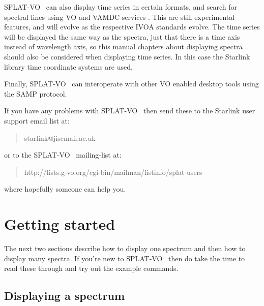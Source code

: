 \documentclass[twoside,11pt,nolof]{starlink}
\providecommand{\SPLAT}{\textsf{SPLAT-VO }}
\begin{document}
\SPLAT\ can also display time series in certain formats, and search for spectral lines
using VO and VAMDC services . This are still  experimental features, and will evolve 
as  the respective IVOA standards evolve. The time series will be displayed the same way
as the spectra, just that there is a time axis instead of wavelength axis, so this manual 
chapters about displaying spectra should also be considered when displaying time series.
In this case the Starlink  library time coordinate systems are used.

Finally, \SPLAT\ can interoperate with other VO enabled desktop tools using
the SAMP protocol.


If you have any problems with \SPLAT\, then send these to the Starlink user
support email list at:
\begin{quote}
\begin{terminalv}
   starlink@jiscmail.ac.uk
\end{terminalv}
\end{quote}
or to the \SPLAT\ mailing-list at:
\begin{quote}
\begin{terminalv}
http://lists.g-vo.org/cgi-bin/mailman/listinfo/splat-users
\end{terminalv}
\end{quote}

where hopefully someone can help you.

\section{Getting started}

The next two sections describe how to display one spectrum and then
how to display many spectra. If you're new to \SPLAT\ then do take the
time to read these through and try out the example commands.

\newpage

\subsection{Displaying a spectrum}
\end{document}
